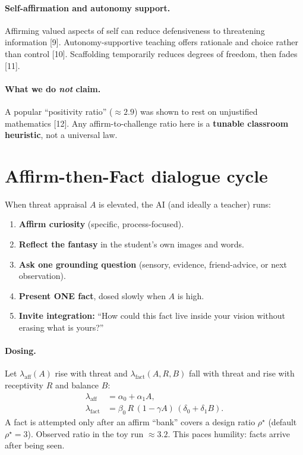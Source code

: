 \documentclass[11pt, a4paper]{article}
\begin{document}
\paragraph{Self-affirmation and autonomy support.}
Affirming valued aspects of self can reduce defensiveness to threatening information [9]. Autonomy-supportive teaching offers rationale and choice rather than control [10]. Scaffolding temporarily reduces degrees of freedom, then fades [11].

\paragraph{What we do \emph{not} claim.}
A popular ``positivity ratio'' ($\approx 2.9$) was shown to rest on unjustified mathematics [12]. Any affirm-to-challenge ratio here is a \textbf{tunable classroom heuristic}, not a universal law.

\section{Affirm-then-Fact dialogue cycle}
When threat appraisal $A$ is elevated, the AI (and ideally a teacher) runs:
\begin{enumerate}[leftmargin=1.3em]
  \item \textbf{Affirm curiosity} (specific, process-focused).
  \item \textbf{Reflect the fantasy} in the student's own images and words.
  \item \textbf{Ask one grounding question} (sensory, evidence, friend-advice, or next observation).
  \item \textbf{Present ONE fact}, dosed slowly when $A$ is high.
  \item \textbf{Invite integration:} ``How could this fact live inside your vision without erasing what is yours?''
\end{enumerate}
\paragraph{Dosing.}
Let $\lambda_{\mathrm{aff}}(A)$ rise with threat and $\lambda_{\mathrm{fact}}(A,R,B)$ fall with threat and rise with receptivity $R$ and balance $B$:
\begin{align}
\lambda_{\mathrm{aff}} &= \alpha_0 + \alpha_1 A,\\
\lambda_{\mathrm{fact}} &= \beta_0\, R\, (1-\gamma A)\, (\delta_0+\delta_1 B).
\end{align}
A fact is attempted only after an affirm ``bank'' covers a design ratio $\rho^\star$ (default $\rho^\star=3$). Observed ratio in the toy run $\approx 3.2$. This paces humility: facts arrive after being seen.
\end{document}
